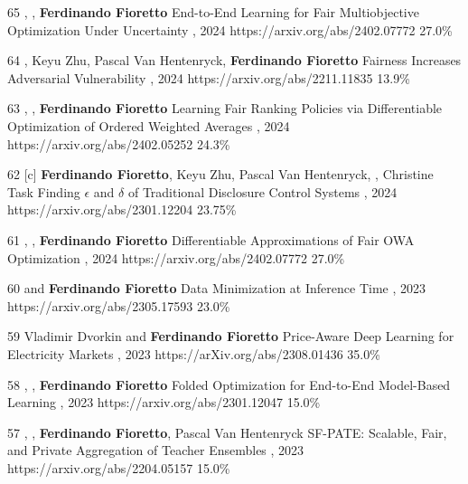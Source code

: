 \begin{pubs}
\confentry
	{65}
	{, , {\bf Ferdinando Fioretto}}
	{End-to-End Learning for Fair Multiobjective Optimization Under Uncertainty}
	{\procUAI, 2024}
	{https://arxiv.org/abs/2402.07772}
	{27.0\%}

\confentry
	{64}%
	{, Keyu Zhu, Pascal Van Hentenryck, {\bf Ferdinando Fioretto}}
	{Fairness Increases Adversarial Vulnerability}
	{\procIJCAI, 2024}
	{https://arxiv.org/abs/2211.11835}
	{13.9\%}

\confentry
	{63}
	{, , {\bf Ferdinando Fioretto}}
	{Learning Fair Ranking Policies via Differentiable Optimization of Ordered Weighted Averages}
	{\procFAccT, 2024}
	{https://arxiv.org/abs/2402.05252}
	{24.3\%}

\confentry
	{62}
	{[c] {\bf Ferdinando Fioretto}, Keyu Zhu, Pascal Van Hentenryck, , Christine Task}
  	{Finding $\epsilon$ and $\delta$ of Traditional Disclosure Control Systems}
	{\procAAAI, 2024}
	{https://arxiv.org/abs/2301.12204}
	{23.75\%}

\confentry
	{61}
	{, , {\bf Ferdinando Fioretto}}
	{Differentiable Approximations of Fair OWA Optimization}
	{, 2024}
	{https://arxiv.org/abs/2402.07772}
	{27.0\%}



\confentry
	{60}
	{ and {\bf Ferdinando Fioretto}}
	{Data Minimization at Inference Time}
	{\procNeurIPS, 2023}
	{https://arxiv.org/abs/2305.17593}
	{23.0\%}

\confentry
	{59}
 	{Vladimir Dvorkin and {\bf Ferdinando Fioretto}}
  	{Price-Aware Deep Learning for Electricity Markets}
  	{, 2023}
  	{https://arXiv.org/abs/2308.01436}
  	{35.0\%}

\confentry 
	{58} %
	{, , {\bf Ferdinando Fioretto}}
	{Folded Optimization for End-to-End Model-Based Learning}
	{\procIJCAI, 2023}
	{https://arxiv.org/abs/2301.12047}
	{15.0\%}

\confentry
    {57} %
	{, , {\bf Ferdinando Fioretto}, Pascal Van Hentenryck}
	{SF-PATE: Scalable, Fair, and Private Aggregation of Teacher Ensembles}
    {\procIJCAI, 2023}
	{https://arxiv.org/abs/2204.05157}
    {15.0\%}


\end{pubs}
